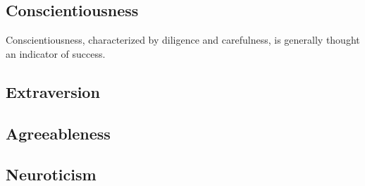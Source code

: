 \documentclass[conference]{IEEEtran}
\begin{document}
\subsection{Conscientiousness}\label{Conscientiousness}
Conscientiousness, characterized by diligence and carefulness, is generally thought an
indicator of success.  
\subsection{Extraversion}\label{Extraversion}
\subsection{Agreeableness}\label{Agreeableness}
\subsection{Neuroticism}\label{Neuroticism}


\vspace{12pt}
\end{document}
